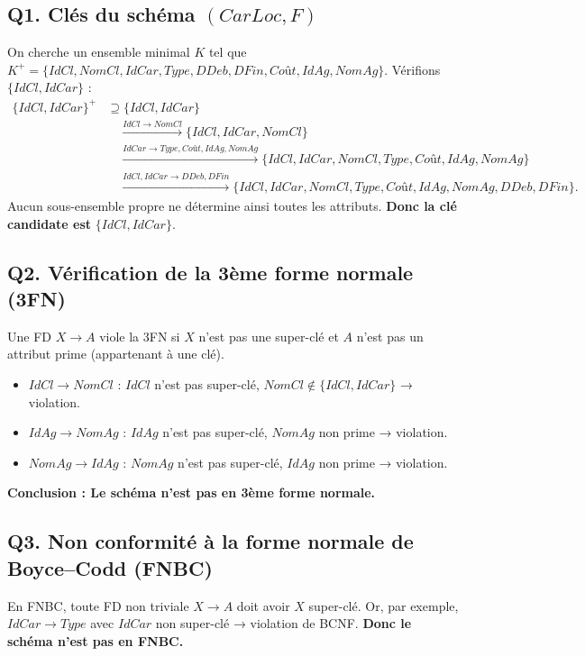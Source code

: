 \documentclass[a4paper,11pt]{article}
\begin{document}
\subsection*{Q1. Clés du schéma $(CarLoc,F)$}
On cherche un ensemble minimal $K$ tel que $K^+ = \{IdCl,NomCl,IdCar,Type,DDeb,DFin,Coût,IdAg,NomAg\}$.  
Vérifions $\{IdCl,IdCar\}$ :
\begin{align*}
\{IdCl,IdCar\}^+ &\supseteq \{IdCl,IdCar\} \\
&\quad\stackrel{IdCl\to NomCl}{\longrightarrow} \{IdCl,IdCar,NomCl\} \\
&\quad\stackrel{IdCar\to Type,Coût,IdAg,NomAg}{\longrightarrow} 
       \{IdCl,IdCar,NomCl,Type,Coût,IdAg,NomAg\} \\
&\quad\stackrel{IdCl,IdCar\to DDeb,DFin}{\longrightarrow}
       \{IdCl,IdCar,NomCl,Type,Coût,IdAg,NomAg,DDeb,DFin\}.
\end{align*}
Aucun sous-ensemble propre ne détermine ainsi toutes les attributs.  
\textbf{Donc la clé candidate est} $\{IdCl,IdCar\}$.\\

\subsection*{Q2. Vérification de la 3\`eme forme normale (3FN)}
Une FD $X\to A$ viole la 3FN si $X$ n'est pas une super-clé et $A$ n'est pas un attribut prime (appartenant à une clé).  
\begin{itemize}
  \item $IdCl\to NomCl$ : $IdCl$ n'est pas super-clé, $NomCl\notin\{IdCl,IdCar\}$ → violation.
  \item $IdAg\to NomAg$ : $IdAg$ n'est pas super-clé, $NomAg$ non prime → violation.
  \item $NomAg\to IdAg$ : $NomAg$ n'est pas super-clé, $IdAg$ non prime → violation.
\end{itemize}
\textbf{Conclusion : Le schéma n'est pas en 3\`eme forme normale.}\\

\subsection*{Q3. Non conformité à la forme normale de Boyce–Codd (FNBC)}
En FNBC, toute FD non triviale $X\to A$ doit avoir $X$ super-clé.  
Or, par exemple, $IdCar\to Type$ avec $IdCar$ non super-clé → violation de BCNF.  
\textbf{Donc le schéma n'est pas en FNBC.}\\
\end{document}
